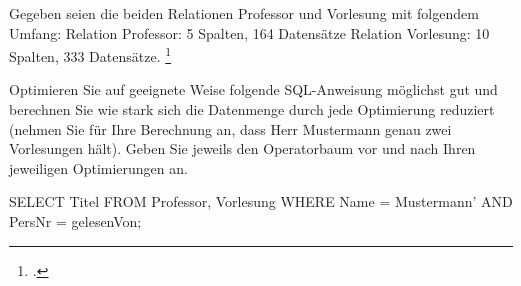 \documentclass{lehramt-informatik-aufgabe}
\begin{document}

Gegeben seien die beiden Relationen Professor und Vorlesung mit folgendem Umfang:
Relation Professor: 5 Spalten, 164 Datensätze
Relation Vorlesung: 10 Spalten, 333 Datensätze.
\footcite{examen:66116:2019:09}

Optimieren Sie auf geeignete Weise folgende SQL-Anweisung möglichst gut und berechnen Sie wie
stark sich die Datenmenge durch jede Optimierung reduziert (nehmen Sie für Ihre Berechnung an, dass
Herr Mustermann genau zwei Vorlesungen hält). Geben Sie jeweils den Operatorbaum vor und nach
Ihren jeweiligen Optimierungen an.

SELECT Titel FROM Professor, Vorlesung WHERE Name = Mustermann’ AND PersNr =
gelesenVon;
\end{document}
